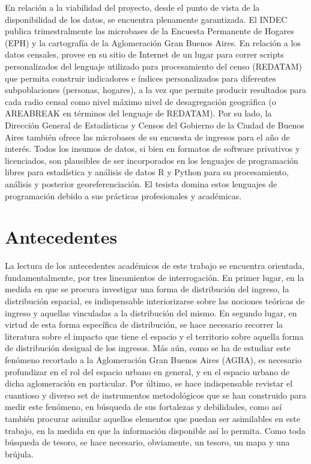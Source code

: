 En relación a la viabilidad del proyecto, desde el punto de vista de la disponibilidad de los datos, se encuentra plenamente garantizada. El INDEC publica trimestralmente las microbases de la Encuesta Permanente de Hogares (EPH) y la cartografía de la Aglomeración Gran Buenos Aires. En relación a los datos censales, provee en su sitio de Internet de un lugar para correr scripts personalizados del lenguaje utilizado para procesamiento del censo (REDATAM) que permita construir indicadores e índices personalizados para diferentes subpoblaciones (personas, hogares), a la vez que permite producir resultados para cada radio censal como nivel máximo nivel de desagregación geográfica (o AREABREAK en términos del lenguaje de REDATAM). Por su lado, la Dirección General de Estadísticas y Censos del Gobierno de la Ciudad de Buenos Aires también ofrece las microbases de su encuesta de ingresos para el año de interés. Todos los insumos de datos, si bien en formatos de software privativos y licenciados, son plausibles de ser incorporados en los lenguajes de programación libres para estadística y análisis de datos R y Python para su procesamiento, análisis y posterior georeferenciación. El tesista domina estos lenguajes de programación debido a sus prácticas profesionales y académicas.
 
	\section{Antecedentes}

La lectura de los antecedentes académicos de este trabajo se encuentra orientada, fundamentalmente, por tres lineamientos de interrogación. En primer lugar, en la medida en que se procura investigar una forma de distribución del ingreso, la distribución espacial, es indispensable interiorizarse sobre las nociones teóricas de ingreso y aquellas vinculadas a la distribución del mismo. En segundo lugar, en virtud de esta forma específica de distribución, se hace necesario recorrer la literatura sobre el impacto que tiene el espacio y el territorio sobre aquella forma de distribución desigual de los ingresos. Más aún, como se ha de estudiar este fenómeno recortado a la Aglomeración Gran Buenos Aires (AGBA), es necesario profundizar en el rol del espacio urbano en general, y en el espacio urbano de dicha aglomeración en particular. Por último, se hace indispensable revistar el cuantioso y diverso set de instrumentos metodológicos que se han construido para medir este fenómeno, en búsqueda de sus fortalezas y debilidades, como así también procurar asimilar aquellos elementos que puedan ser asimilables en este trabajo, en la medida en que la información disponible así lo permita. Como toda búsqueda de tesoro, se hace necesario, obviamente, un tesoro, un mapa y una brújula.

